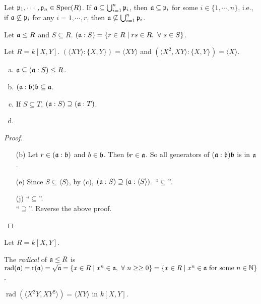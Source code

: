 \begin{theorem}
    Let $\mathfrak{p}_1,\cdots,\mathfrak{p}_n \in \operatorname{Spec}(R)$. If $\mathfrak{a} \subseteq \bigcup_{i=1}^n \mathfrak{p}_i$, then $\mathfrak{a} \subseteq \mathfrak{p}_i$ for some $i \in \{1,\cdots,n\}$, i.e., if $\mathfrak{a} \not \subseteq \mathfrak{p}_i$ for any $i = 1,\cdots,r$, then $\mathfrak{a} \not \subseteq \bigcup_{i=1}^n \mathfrak{p}_i$.
\end{theorem}





\begin{definition}
    Let $\mathfrak{a} \leq R$ and $S \subseteq R$. $(\mathfrak{a}:S) = \{r \in R \mid rs \in R,\ \forall \  s \in S\}$.
\end{definition}

\begin{example}
    Let $R = k[X,Y]$. $(\langle XY \rangle: \{X,Y\}) = \langle XY \rangle$ and $(\langle X^2,XY \rangle: \{X,Y\}) = \langle X \rangle$.
\end{example}

\begin{fact}
    \begin{enumerate}[(a)]
        \item $\mathfrak{a} \subseteq (\mathfrak{a}:S) \leq R$.
        \item $(\mathfrak{a}:\mathfrak{b})\mathfrak{b} \subseteq \mathfrak{a}$. 
        \item If $S \subseteq T$, $(\mathfrak{a}:S) \supseteq (\mathfrak{a}:T)$.
        \item 
    \end{enumerate}
\end{fact}

\begin{proof}
    \begin{enumerate}
        \item[(b)]
            Let $r \in (\mathfrak{a}:\mathfrak{b})$ and $b \in \mathfrak{b}$. Then $br \in \mathfrak{a}$. So all generators of $(\mathfrak{a}:\mathfrak{b})\mathfrak{b}$ is in $\mathfrak{a}$.
        \item[(e)]
            Since $S \subseteq \langle S \rangle$, by (c), $(\mathfrak{a}:S) \supseteq (\mathfrak{a}:\langle S \rangle)$. ``$\subseteq$''.
        \item [(j)]
            ``$\subseteq$''.\\
            ``$\supseteq$''. Reverse the above proof.
    \end{enumerate}
\end{proof}

\begin{example}
    Let $R = k[X,Y]$.
\end{example}

\begin{definition}
    The \emph{radical} of $\mathfrak{a} \leq R$ is $\operatorname{rad}(\mathfrak{a}) = \operatorname{r}(\mathfrak{a}) = \sqrt {\mathfrak{a}} = \{x \in R \mid x^n \in \mathfrak{a}, \ \forall \  n \geq\geq 0\} = \{x \in R \mid x^n \in \mathfrak{a} \text{ for some }n \in \mathbb{N}\}$. 
\end{definition}

\begin{example}
    $\operatorname{rad}(\langle X^2Y,XY^2 \rangle) = \langle XY \rangle$ in $k[X,Y]$.
\end{example}

